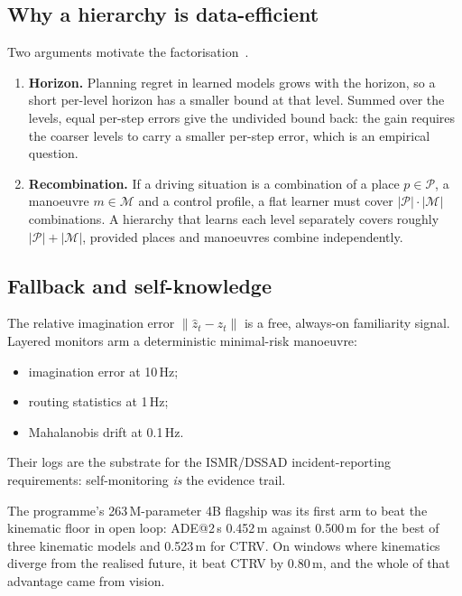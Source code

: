 \documentclass[10pt,twocolumn]{article}
\theoremstyle{remark}
\begin{document}
\subsection{Why a hierarchy is data-efficient}
Two arguments motivate the factorisation~\cite{hplwm,ssshashua}.
\begin{enumerate}[label=(\roman*)]
  \item \textbf{Horizon.} Planning regret in learned models grows with the horizon, so a short per-level horizon has a smaller bound at
        that level. Summed over the levels, equal per-step errors give the undivided bound back: the gain requires the coarser levels
        to carry a smaller per-step error, which is an empirical question.
  \item \textbf{Recombination.} If a driving situation is a combination of a place $p\in\mathcal P$, a manoeuvre $m\in\mathcal M$ and a
        control profile, a flat learner must cover $|\mathcal P|\cdot|\mathcal M|$ combinations. A hierarchy that learns each level
        separately covers roughly $|\mathcal P|+|\mathcal M|$, provided places and manoeuvres combine independently.
\end{enumerate}

\subsection{Fallback and self-knowledge}
The relative imagination error $\|\hat z_t-z_t\|$ is a free, always-on familiarity signal. Layered monitors arm a deterministic
minimal-risk manoeuvre:
\begin{itemize}
  \item imagination error at 10\,Hz;
  \item routing statistics at 1\,Hz;
  \item Mahalanobis drift at 0.1\,Hz.
\end{itemize}
Their logs are the substrate for the ISMR/DSSAD incident-reporting requirements: self-monitoring \emph{is} the evidence trail.

The programme's 263\,M-parameter 4B flagship was its first arm to beat the kinematic floor in open loop: ADE@2\,s 0.452\,m against
0.500\,m for the best of three kinematic models and 0.523\,m for CTRV. On windows where kinematics diverge from the realised future, it
beat CTRV by 0.80\,m, and the whole of that advantage came from vision.

\end{document}
